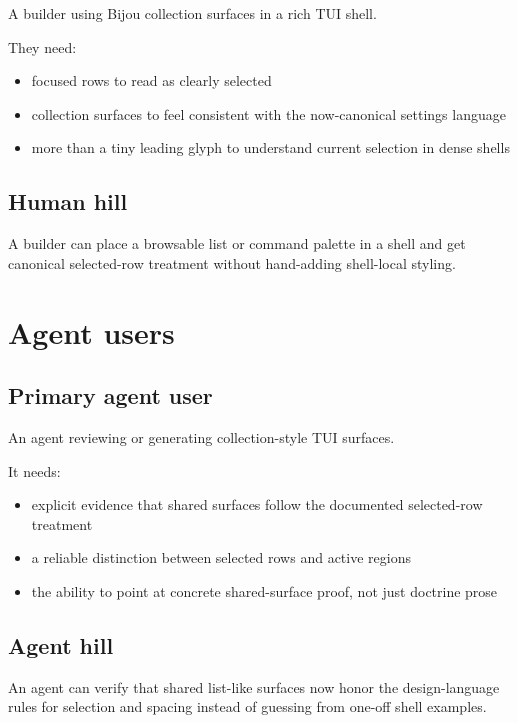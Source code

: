 A builder using Bijou collection surfaces in a rich TUI shell.

They need:

\begin{itemize}
\tightlist
\item
  focused rows to read as clearly selected
\item
  collection surfaces to feel consistent with the now-canonical settings language
\item
  more than a tiny leading glyph to understand current selection in dense shells
\end{itemize}

\subsection{Human hill}\label{record-170-human-hill}

A builder can place a browsable list or command palette in a shell and get canonical selected-row treatment without hand-adding shell-local styling.

\section{Agent users}\label{record-170-agent-users}

\subsection{Primary agent user}\label{record-170-primary-agent-user}

An agent reviewing or generating collection-style TUI surfaces.

It needs:

\begin{itemize}
\tightlist
\item
  explicit evidence that shared surfaces follow the documented selected-row treatment
\item
  a reliable distinction between selected rows and active regions
\item
  the ability to point at concrete shared-surface proof, not just doctrine prose
\end{itemize}

\subsection{Agent hill}\label{record-170-agent-hill}

An agent can verify that shared list-like surfaces now honor the design-language rules for selection and spacing instead of guessing from one-off shell examples.

